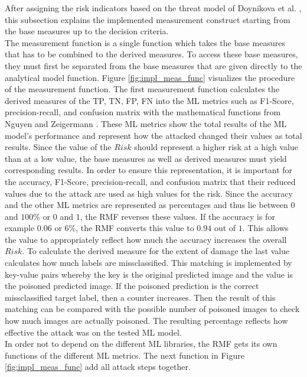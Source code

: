After assigning the risk indicators based on the threat model of Doynikova et al. \cite{DBLP:conf/crisis/DoynikovaNGK20}, this subsection explains the implemented measurement construct starting from the base measures up to the decision criteria. \\
The measurement function is a single function which takes the base measures that has to be combined to the derived measures. To access these base measures, they must first be separated from the base measures that are given directly to the analytical model function. Figure \ref{fig:impl_meas_func} visualizes the procedure of the measurement function. The first measurement function calculates the derived measures of the TP, TN, FP, FN into the ML metrics such as F1-Score, precision-recall, and confusion matrix with the mathematical functions from Nguyen and Zeigermann \cite{9783960101925}. These ML metrics show the total results of the ML model's performance and represent how the attacked changed their values as total results.
Since the value of the $Risk$ should represent a higher risk at a high value than at a low value, the base measures as well as derived measures must yield corresponding results. In order to ensure this representation, it is important for the accuracy, F1-Score, precision-recall, and confusion matrix that their reduced values due to the attack are used as high values for the risk. Since the accuracy and the other ML metrics are represented as percentages and thus lie between $0$ and $100\%$ or $0$ and $1$, the RMF reverses these values. If the accuracy
is for example $0.06$ or $6\%$, the RMF converts this value to $0.94$ out of $1$. This allows the value to appropriately reflect how much the accuracy increases the overall $Risk$. To calculate the derived measure for the extent of damage the last value calculates how much labels are missclassified. This matching is implemented by key-value pairs whereby the key is the original predicted image and the value is the poisoned predicted image. If the poisoned prediction is the correct missclassified target label, then a counter increases. Then the result of this matching can be compared with the possible number of poisoned images to check how much images are actually poisoned. The resulting percentage reflects how effective the attack was on the tested ML model. \\
In order not to depend on the different ML libraries, the RMF gets its own functions of the different ML metrics. The next function in Figure \ref{fig:impl_meas_func} add all attack steps together.


